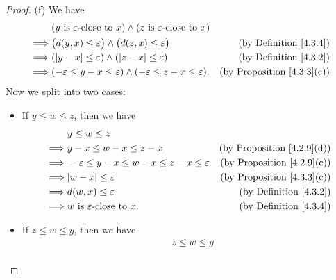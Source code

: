 \begin{proof}{(f)}
    We have
    \begin{align*}
                 & (y \text{ is } \varepsilon\text{-close to } x) \land (z \text{ is } \varepsilon\text{-close to } x)                                          \\
        \implies & \big(d(y, x) \leq \varepsilon\big) \land \big(d(z, x) \leq \varepsilon\big)                         & \text{(by Definition \ref{4.3.4})}     \\
        \implies & (\left\lvert y - x\right\rvert \leq \varepsilon) \land (\left\lvert z - x\right\rvert \leq \varepsilon)                                 & \text{(by Definition \ref{4.3.2})}     \\
        \implies & (-\varepsilon \leq y - x \leq \varepsilon) \land (-\varepsilon \leq z - x \leq \varepsilon).        & \text{(by Proposition \ref{4.3.3}(c))}
    \end{align*}
    Now we split into two cases:
    \begin{itemize}
        \item If \(y \leq w \leq z\), then we have
              \begin{align*}
                           & y \leq w \leq z                                                                                         \\
                  \implies & y - x \leq w - x \leq z - x                                    & \text{(by Proposition \ref{4.2.9}(d))} \\
                  \implies & -\varepsilon \leq y - x \leq w - x \leq z - x \leq \varepsilon & \text{(by Proposition \ref{4.2.9}(c))} \\
                  \implies & \abs{w - x} \leq \varepsilon                                   & \text{(by Proposition \ref{4.3.3}(c))} \\
                  \implies & d(w, x) \leq \varepsilon                                       & \text{(by Definition \ref{4.3.2})}     \\
                  \implies & w \text{ is } \varepsilon\text{-close to } x.                  & \text{(by Definition \ref{4.3.4})}
              \end{align*}
        \item If \(z \leq w \leq y\), then we have
              \begin{align*}
                           & z \leq w \leq y                                                                                         \\

\end{align*}
\end{itemize}
\end{proof}
